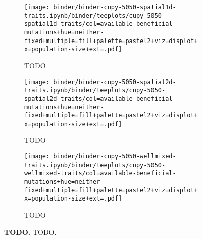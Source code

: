 \begin{figure}[h]
    \begin{subfigure}[b]{\linewidth}
        \begin{minipage}{\textwidth}
        \centering
          \texttt{[image: binder/binder-cupy-5050-spatial1d-traits.ipynb/binder/teeplots/cupy-5050-spatial1d-traits/col=available-beneficial-mutations+hue=neither-fixed+multiple=fill+palette=pastel2+viz=displot+x=population-size+ext=.pdf]}%
        \end{minipage}
        \begin{minipage}{\textwidth}
        \caption{TODO}
        \label{fig:neither-fixed-5050-cupy:spatial1d}
        \end{minipage}%
    \end{subfigure}

    \begin{subfigure}[b]{\linewidth}
        \begin{minipage}{\textwidth}
          \centering
          \texttt{[image: binder/binder-cupy-5050-spatial2d-traits.ipynb/binder/teeplots/cupy-5050-spatial2d-traits/col=available-beneficial-mutations+hue=neither-fixed+multiple=fill+palette=pastel2+viz=displot+x=population-size+ext=.pdf]}%
        \end{minipage}
        \begin{minipage}{\textwidth}
        \caption{TODO}
        \label{fig:neither-fixed-5050-cupy:spatial2d}
        \end{minipage}%
    \end{subfigure}%

\begin{subfigure}[b]{\linewidth}
    \begin{minipage}{\textwidth}
      \centering
      \texttt{[image: binder/binder-cupy-5050-wellmixed-traits.ipynb/binder/teeplots/cupy-5050-wellmixed-traits/col=available-beneficial-mutations+hue=neither-fixed+multiple=fill+palette=pastel2+viz=displot+x=population-size+ext=.pdf]}%
    \end{minipage}
    \begin{minipage}{\textwidth}
    \caption{TODO}
    \label{fig:neither-fixed-5050-cupy:wellmixed}
    \end{minipage}%
\end{subfigure}%


  \begin{minipage}{\textwidth}
    \caption{%
      \textbf{TODO.}
      \footnotesize
     TODO.
    }
    \label{fig:neither-fixed-5050-cupy}
  \end{minipage}
\end{figure}
